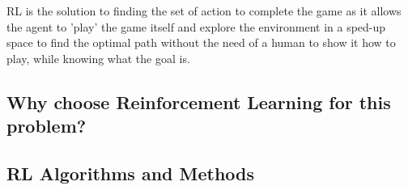 RL is the solution to finding the set of action to complete the game as it allows the agent to 'play' the game itself and explore the environment in a sped-up space to find the optimal path without the need of a human to show it how to play, while knowing what the goal is. 

\subsection*{Why choose Reinforcement Learning for this problem?}

\subsection{RL Algorithms and Methods}